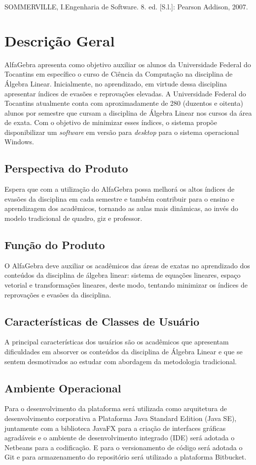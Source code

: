 \documentclass{scrreprt}
\begin{document}
\noindent SOMMERVILLE, I.Engenharia de Software. 8. ed. [S.l.]:  Pearson Addison, 2007.

\chapter{Descrição Geral}
AlfaGebra apresenta como objetivo auxiliar os alunos da Universidade Federal do Tocantins em específico o curso de Ciência da Computação na disciplina de Álgebra Linear. Inicialmente, no aprendizado, em virtude dessa disciplina apresentar índices de evasões e reprovações elevadas. A Universidade Federal do Tocantins atualmente conta com aproximadamente de 280 (duzentos e oitenta) alunos por semestre que cursam a disciplina de Álgebra Linear nos cursos da área de exata. Com o objetivo de minimizar esses índices, o sistema propõe disponibilizar um \textit{software} em versão para \textit{desktop} para o sistema operacional Windows.

\section{Perspectiva do Produto}
Espera que com a utilização do AlfaGebra possa melhorá os altos índices de evasões da disciplina em cada semestre e também contribuir para o ensino e aprendizagem dos acadêmicos, tornando as aulas mais dinâmicas, ao invés do modelo tradicional de quadro, giz e professor.

\section{Função do Produto}
O AlfaGebra deve auxiliar os acadêmicos das áreas de exatas no aprendizado dos conteúdos da disciplina de álgebra linear: sistema de equações lineares, espaço vetorial e transformações lineares, deste modo, tentando minimizar os índices de reprovações e evasões da disciplina.

\section{Características de Classes de Usuário}
A principal características dos usuários são os acadêmicos que apresentam dificuldades em absorver os conteúdos da disciplina de Álgebra Linear e que se sentem desmotivados ao estudar com abordagem da metodologia tradicional.

\section{Ambiente Operacional}
Para o desenvolvimento da plataforma será utilizada como arquitetura de desenvolvimento corporativa a Plataforma Java Standard Edition (Java SE), juntamente com a biblioteca JavaFX para a criação de interfaces gráficas agradáveis e o ambiente de desenvolvimento integrado (IDE) será adotada o Netbeans para a codificação. E para o versionamento de código será adotada o Git e para armazenamento do repositório será utilizado a plataforma Bitbucket.
\end{document}

